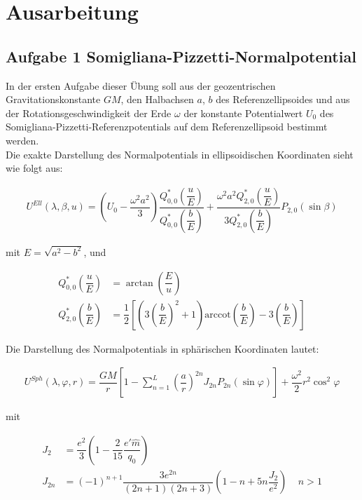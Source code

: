 \chapter*{Ausarbeitung}

\section*{Aufgabe 1 Somigliana-Pizzetti-Normalpotential}

In der ersten Aufgabe dieser Übung soll aus der geozentrischen Gravitationskonstante $GM$, den Halbachsen $a$, $b$ des Referenzellipsoides und aus der Rotationsgeschwindigkeit der Erde $\omega$ der konstante Potentialwert $U_0$ des Somigliana-Pizzetti-Referenzpotentials auf dem Referenzellipsoid bestimmt werden. \\

Die exakte Darstellung des Normalpotentials in ellipsoidischen Koordinaten sieht wie folgt aus:

\begin{align}
U^{Ell}(\lambda,\beta,u) = \left(U_0 - \dfrac{\omega^2 a^2}{3}\right) \dfrac{Q_{0,0}^{*}\left(\dfrac{u}{E}\right)}{{Q_{0,0}^{*}\left(\dfrac{b}{E}\right)}} + \dfrac{\omega^2 a^2 Q_{2,0}^{*}\left(\dfrac{u}{E}\right)}{3 Q_{2,0}^{*}\left(\dfrac{b}{E}\right)} P_{2,0}(\sin \beta)
\end{align}

mit $E = \sqrt{a^2 - b^2}$, und 

\begin{align*}
Q_{0,0}^{*}\left(\dfrac{u}{E}\right) &= \arctan \left(\dfrac{E}{u}\right) \\
Q_{2,0}^{*}\left(\dfrac{b}{E}\right) &= \dfrac{1}{2} \left[\left(3 \left(\dfrac{b}{E}\right)^2+1\right) \text{arccot} \left(\dfrac{b}{E}\right)-3 \left(\dfrac{b}{E}\right)\right]
\end{align*}

Die Darstellung des Normalpotentials in sphärischen Koordinaten lautet: 

\begin{align}
U^{Sph}(\lambda,\varphi,r)= \dfrac{GM}{r} \left[1-\sum_{n=1}^{L} \left(\dfrac{a}{r}\right)^{2n} J_{2n} P_{2n} (\sin \varphi)\right] + \dfrac{\omega^2}{2} r^2 \cos^2 \varphi
\end{align}

mit 

\begin{align*}
J_2 &= \dfrac{e^2}{3} \left(1-\dfrac{2}{15} \dfrac{e'\hat{m}}{q_0}\right) \\
J_{2n} &= (-1)^{n+1} \dfrac{3e^{2n}}{(2n+1)(2n+3)} \left(1-n+5n \dfrac{J_2}{e^2}\right) ~~~~~ n > 1 
\end{align*}

